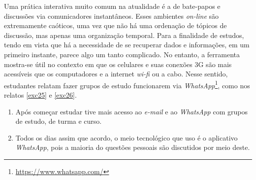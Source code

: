 \documentclass{textolivre}
\begin{document}
Uma prática interativa muito comum na atualidade é a de bate-papos e discussões via comunicadores instantâneos. Esses ambientes \textit{on-line} são extremamente caóticos, uma vez que não há uma ordenação de tópicos de discussão, mas apenas uma organização temporal. Para a finalidade de estudos, tendo em vista que há a necessidade de se recuperar dados e informações, em um primeiro instante, parece algo um tanto complicado. No entanto, a ferramenta mostra-se útil no contexto em que os celulares e suas conexões 3G são mais acessíveis que os computadores e a internet \textit{wi-fi} ou a cabo. Nesse sentido, estudantes relatam fazer grupos de estudo funcionarem via \textit{WhatsApp}\footnote{\url{https://www.whatsapp.com/}}, como nos relatos \ref{exc25} e \ref{exc26}.


\begin{enumerate}[resume,label={(\arabic*)},ref={\arabic*},topsep=1ex,partopsep=1ex]
\item\label{exc25} Após começar estudar tive mais acesso ao \textit{e-mail} e ao \textit{WhatsApp} com grupos de  estudo, de turma e curso.
\item\label{exc26} Todos os dias assim que acordo, o meio tecnológico que uso é o aplicativo \textit{WhatsApp}, pois a maioria do questões pessoais são discutidos por meio deste.
\end{enumerate}
\end{document}
